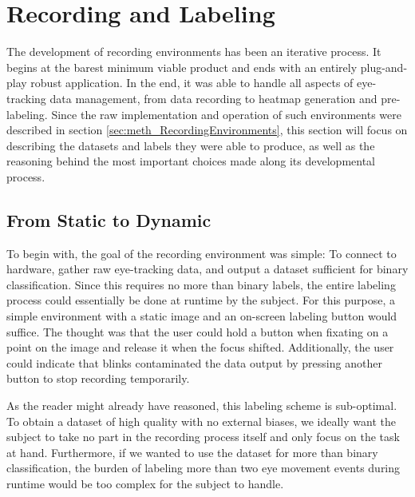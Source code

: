 \section{Recording and Labeling} \label{sec:disc_RecordingAndLabeling}



The development of recording environments has been an iterative process. It begins at the barest minimum viable product and ends with an entirely plug-and-play robust application. In the end, it was able to handle all aspects of eye-tracking data management, from data recording to heatmap generation and pre-labeling. Since the raw implementation and operation of such environments were described in section \ref{sec:meth_RecordingEnvironments}, this section will focus on describing the datasets and labels they were able to produce, as well as the reasoning behind the most important choices made along its developmental process. 

\subsection{From Static to Dynamic}

To begin with, the goal of the recording environment was simple: To connect to hardware, gather raw eye-tracking data, and output a dataset sufficient for binary classification. Since this requires no more than binary labels, the entire labeling process could essentially be done at runtime by the subject. For this purpose, a simple environment with a static image and an on-screen labeling button would suffice. The thought was that the user could hold a button when fixating on a point on the image and release it when the focus shifted. Additionally, the user could indicate that blinks contaminated the data output by pressing another button to stop recording temporarily.

As the reader might already have reasoned, this labeling scheme is sub-optimal. To obtain a dataset of high quality with no external biases, we ideally want the subject to take no part in the recording process itself and only focus on the task at hand. Furthermore, if we wanted to use the dataset for more than binary classification, the burden of labeling more than two eye movement events during runtime would be too complex for the subject to handle. 

